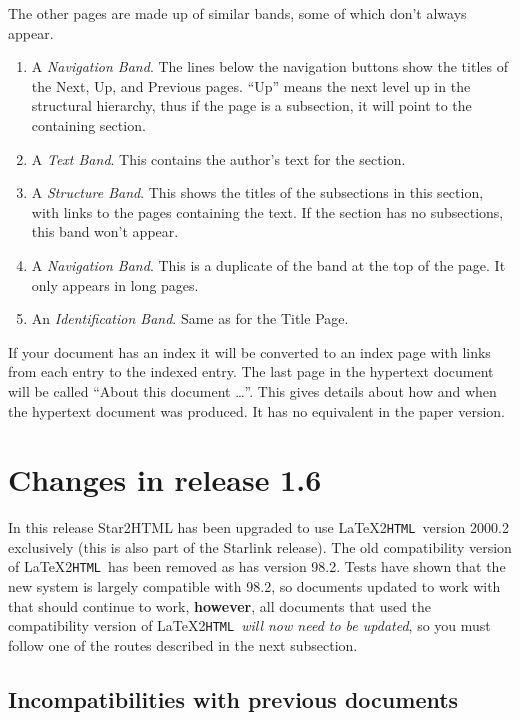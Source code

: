 \documentclass[twoside,11pt,nolof]{starlink}
\providecommand{\latextohtml}{\LaTeX2\texttt{HTML}}
\begin{document}
The other pages are made up of similar bands, some of which don't always
appear.

\begin{enumerate}
\item A \emph{Navigation Band}.
The lines below the navigation buttons show the titles of the Next, Up, and
Previous pages.
``Up'' means the next level up in the structural hierarchy, thus if the page is
a subsection, it will point to the containing section.
\item A \emph{Text Band}.
This contains the author's text for the section.
\item A \emph{Structure Band}.
This shows the titles of the subsections in this section, with links to the
pages containing the text.
If the section has no subsections, this band won't appear.
\item A \emph{Navigation Band}.
This is a duplicate of the band at the top of the page.
It only appears in long pages.
\item An \emph{Identification Band}.
 Same as for the Title Page.
\end{enumerate}

If your document has an index it will be converted to an index page with
links from each entry to the indexed entry.
The last page in the hypertext document will be called ``About this
document \ldots''.
This gives details about how and when the hypertext document was produced.
It has no equivalent in the paper version.

\newpage

\section{\label{changes}Changes in release 1.6}
In this release Star2HTML has been upgraded to use \latextohtml\ version
2000.2 exclusively (this is also part of the Starlink release).  The old
compatibility version of \latextohtml\ has been removed as has version
98.2. Tests have shown that the new system is largely compatible with 98.2, so
documents updated to work with that should continue to work, \textbf{however},
all documents that used the compatibility version of \latextohtml\
\textit{will now need to be updated}, so you must follow one of the routes
described in the next subsection.

\subsection{Incompatibilities with previous documents}
\end{document}
